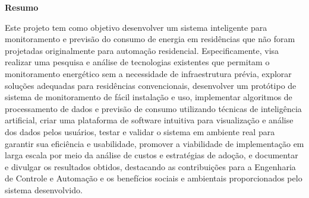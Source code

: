 
\begin{center}
\huge{{\bf Resumo}}
\vspace{2cm}
\end{center}


Este projeto tem como objetivo desenvolver um sistema inteligente para monitoramento e previsão do
consumo de energia em residências que não foram projetadas originalmente para automação residencial.
Especificamente, visa realizar uma pesquisa e análise de tecnologias existentes que permitam o
monitoramento energético sem a necessidade de infraestrutura prévia, explorar soluções adequadas para
residências convencionais, desenvolver um protótipo de sistema de monitoramento de fácil instalação e
uso, implementar algoritmos de processamento de dados e previsão de consumo utilizando técnicas de
inteligência artificial, criar uma plataforma de software intuitiva para visualização e análise dos dados pelos
usuários, testar e validar o sistema em ambiente real para garantir sua eficiência e usabilidade, promover a
viabilidade de implementação em larga escala por meio da análise de custos e estratégias de adoção, e
documentar e divulgar os resultados obtidos, destacando as contribuições para a Engenharia de Controle e
Automação e os benefícios sociais e ambientais proporcionados pelo sistema desenvolvido.


\clearpage
\thispagestyle{empty}
\cleardoublepage

